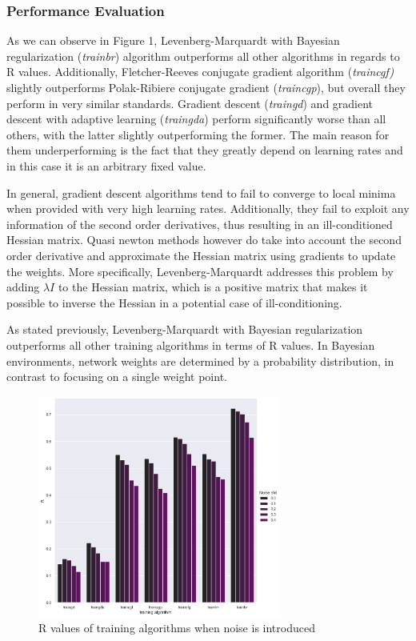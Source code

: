 \documentclass[11pt,conference,compsoc]{IEEEtran}
\begin{document}
\subsubsection{Performance Evaluation}
As we can observe in Figure 1, Levenberg-Marquardt with Bayesian regularization (\textit{trainbr}) algorithm outperforms all other algorithms in regards to R values. Additionally, Fletcher-Reeves conjugate gradient algorithm (\textit{traincgf)} slightly outperforms Polak-Ribiere conjugate gradient  (\textit{traincgp}), but overall they perform in very similar standards. Gradient descent (\textit{traingd}) and gradient descent with adaptive learning (\textit{traingda}) perform significantly worse than all others, with the latter slightly outperforming the former. The main reason for them underperforming is the fact that they greatly depend on learning rates and in this case it is an arbitrary fixed value. 

In general, gradient descent algorithms tend to fail to converge to local minima when provided with very high learning rates. Additionally, they fail to  
exploit any information of the second order derivatives, thus resulting in an ill-conditioned Hessian matrix. 
Quasi newton methods however do take into account the second order derivative and approximate the Hessian matrix using gradients to update the weights. More specifically, Levenberg-Marquardt addresses this problem by adding $\lambda I$ to the Hessian matrix, which is a positive matrix that makes it possible to inverse the Hessian in a potential case of ill-conditioning. 

As stated previously, Levenberg-Marquardt with Bayesian regularization outperforms all other training algorithms in terms of R values. In Bayesian environments, network weights are determined by a probability distribution, in contrast to focusing on a single weight point. 

\begin{figure}
    \centering
    \includegraphics[width=8cm]{images/NoiseStd-R.png}
    \caption{R values of training algorithms when noise is introduced}
    \label{fig:2}
\end{figure}
\end{document}
